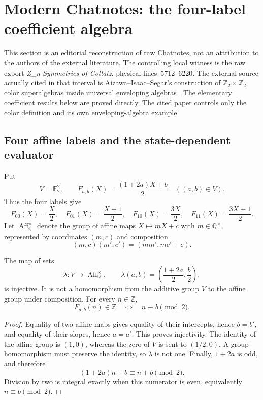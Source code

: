 \section{Modern Chatnotes: the four-label coefficient algebra}
\label{sec:chatnotes-coefficient-algebra}

This section is an editorial reconstruction of raw Chatnotes, not an
attribution to the authors of the external literature.  The controlling local
witness is the raw export \emph{Z\_n Symmetries of Collatz}, physical
lines~5712--6220.  The external source actually cited in that interval is
Aizawa--Isaac--Segar's construction of
$\mathbb Z_2\times\mathbb Z_2$ color superalgebras inside universal
enveloping algebras \cite{AizawaIsaacSegar2019}.  The elementary coefficient
results below are proved directly.  The cited paper controls only the color
definition and its own enveloping-algebra example.

\subsection{Four affine labels and the state-dependent evaluator}

Put
\[
 V=\mathbb F_2^2,
 \qquad
 F_{a,b}(X)=\frac{(1+2a)X+b}{2}
 \quad ((a,b)\in V).
\]
Thus the four labels give
\[
 F_{00}(X)=\frac X2,
 \quad F_{01}(X)=\frac{X+1}{2},
 \quad F_{10}(X)=\frac{3X}{2},
 \quad F_{11}(X)=\frac{3X+1}{2}.
\]
Let $\operatorname{Aff}_{\mathbb Q}^{\times}$ denote the group of affine
maps $X\mapsto mX+c$ with $m\in\mathbb Q^\times$, represented by
coordinates $(m,c)$ and composition
\[
 (m,c)(m',c')=(mm',mc'+c).
\]

\begin{proposition}
\label{prop:chatnotes-affine-label-map}
The map of sets
\[
 \lambda:V\longrightarrow \operatorname{Aff}_{\mathbb Q}^{\times},
 \qquad
 \lambda(a,b)=\left(\frac{1+2a}{2},\frac b2\right),
\]
is injective.  It is not a homomorphism from the additive group $V$ to the
affine group under composition.  For every $n\in\mathbb Z$,
\[
 F_{a,b}(n)\in\mathbb Z
 \quad\Longleftrightarrow\quad
 n\equiv b\pmod 2.
\]
\end{proposition}

\begin{proof}
Equality of two affine maps gives equality of their intercepts, hence
$b=b'$, and equality of their slopes, hence $a=a'$.  This proves
injectivity.  The identity of the affine group is $(1,0)$, whereas the zero
of $V$ is sent to $(1/2,0)$.  A group homomorphism must preserve the identity,
so $\lambda$ is not one.  Finally, $1+2a$ is odd, and therefore
\[
 (1+2a)n+b\equiv n+b\pmod2.
\]
Division by two is integral exactly when this numerator is even, equivalently
$n\equiv b\pmod2$.
\end{proof}

